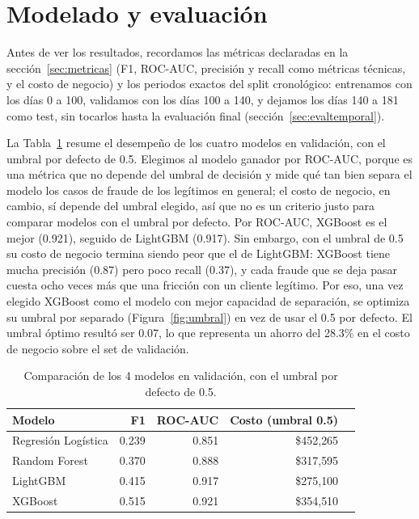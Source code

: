 \documentclass[10pt]{article}
\begin{document}
\section{Modelado y evaluación}
Antes de ver los resultados, recordamos las métricas declaradas en la sección~\ref{sec:metricas} (F1, ROC-AUC, precisión y recall como métricas técnicas, y el costo de negocio) y los periodos exactos del split cronológico: entrenamos con los días 0 a 100, validamos con los días 100 a 140, y dejamos los días 140 a 181 como test, sin tocarlos hasta la evaluación final (sección~\ref{sec:evaltemporal}).

La Tabla~\ref{tab:modelos} resume el desempeño de los cuatro modelos en validación, con el umbral por defecto de 0.5. Elegimos al modelo ganador por ROC-AUC, porque es una métrica que no depende del umbral de decisión y mide qué tan bien separa el modelo los casos de fraude de los legítimos en general; el costo de negocio, en cambio, sí depende del umbral elegido, así que no es un criterio justo para comparar modelos con el umbral por defecto. Por ROC-AUC, XGBoost es el mejor (0.921), seguido de LightGBM (0.917). Sin embargo, con el umbral de 0.5 su costo de negocio termina siendo peor que el de LightGBM: XGBoost tiene mucha precisión (0.87) pero poco recall (0.37), y cada fraude que se deja pasar cuesta ocho veces más que una fricción con un cliente legítimo. Por eso, una vez elegido XGBoost como el modelo con mejor capacidad de separación, se optimiza su umbral por separado (Figura~\ref{fig:umbral}) en vez de usar el 0.5 por defecto. El umbral óptimo resultó ser 0.07, lo que representa un ahorro del 28.3\% en el costo de negocio sobre el set de validación.

\begin{table}[H]
\centering\small
\begin{tabular}{lrrrr}
\toprule
Modelo & F1 & ROC-AUC & Costo (umbral 0.5) \\
\midrule
Regresión Logística & 0.239 & 0.851 & \$452{,}265 \\
Random Forest        & 0.370 & 0.888 & \$317{,}595 \\
LightGBM              & 0.415 & 0.917 & \$275{,}100 \\
XGBoost      & 0.515 & 0.921 & \$354{,}510 \\
\bottomrule
\end{tabular}
\caption{Comparación de los 4 modelos en validación, con el umbral por defecto de 0.5.}
\label{tab:modelos}
\end{table}
\end{document}
